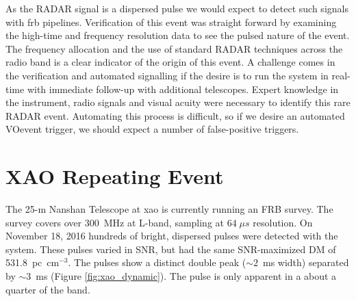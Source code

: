 \documentclass[a4paper,fleqn,usenatbib]{mnras}
\begin{document}
As the RADAR signal is a dispersed pulse we would expect to detect such signals
with \gls{frb} pipelines.  Verification of this event was straight forward by
examining the high-time and frequency resolution data to see the pulsed nature
of the event.  The frequency allocation and the use of standard RADAR techniques
across the radio band is a clear indicator of the origin of this event.  A
challenge comes in the verification and automated signalling if the desire is to
run the system in real-time with immediate follow-up with additional telescopes.
Expert knowledge in the instrument, radio signals and visual acuity were
necessary to identify this rare RADAR event.  Automating this process is
difficult, so if we desire an automated VOevent trigger, we should expect a
number of false-positive triggers.

\section{XAO Repeating Event}
\label{sec:xao_event}


The 25-m Nanshan Telescope at \gls{xao} is currently running an FRB survey. The
survey covers over 300~MHz at L-band, sampling at $64 \; \mu s$ resolution. On
November 18, 2016 hundreds of bright, dispersed pulses were detected with the
system. These pulses varied in SNR, but had the same SNR-maximized DM of
531.8~pc~cm$^{-3}$. The pulses show a distinct double peak ($\sim 2$~ms width)
separated by $\sim 3$~ms (Figure \ref{fig:xao_dynamic}). The pulse is only
apparent in a about a quarter of the band.
\end{document}
